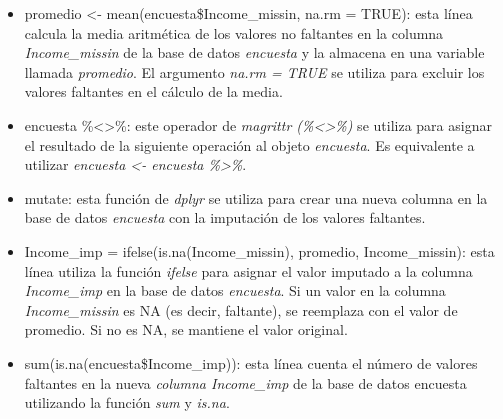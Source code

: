 \documentclass[
  12pt,
]{book}
\begin{document}
\begin{itemize}
\item
  promedio \textless- mean(encuesta\$Income\_missin, na.rm = TRUE): esta línea calcula la media aritmética de los valores no faltantes en la columna \emph{Income\_missin} de la base de datos \emph{encuesta} y la almacena en una variable llamada \emph{promedio}. El argumento \emph{na.rm = TRUE} se utiliza para excluir los valores faltantes en el cálculo de la media.
\item
  encuesta \%\textless\textgreater\%: este operador de \emph{magrittr (\%\textless\textgreater\%)} se utiliza para asignar el resultado de la siguiente operación al objeto \emph{encuesta}. Es equivalente a utilizar \emph{encuesta \textless- encuesta \%\textgreater\%}.
\item
  mutate: esta función de \emph{dplyr} se utiliza para crear una nueva columna en la base de datos \emph{encuesta} con la imputación de los valores faltantes.
\item
  Income\_imp = ifelse(is.na(Income\_missin), promedio, Income\_missin): esta línea utiliza la función \emph{ifelse} para asignar el valor imputado a la columna \emph{Income\_imp} en la base de datos \emph{encuesta}. Si un valor en la columna \emph{Income\_missin} es NA (es decir, faltante), se reemplaza con el valor de promedio. Si no es NA, se mantiene el valor original.
\item
  sum(is.na(encuesta\$Income\_imp)): esta línea cuenta el número de valores faltantes en la nueva \emph{columna Income\_imp} de la base de datos encuesta utilizando la función \emph{sum} y \emph{is.na}.
\end{itemize}
\end{document}
